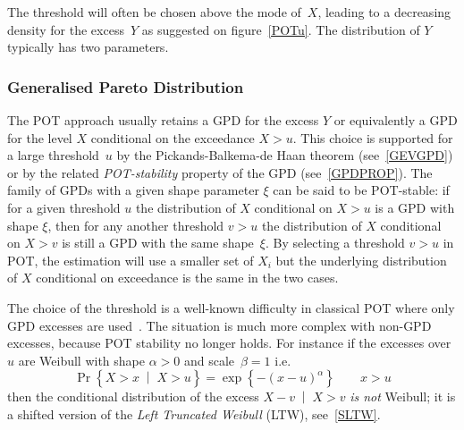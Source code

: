 \documentclass[a4paper]{report}
\newcommand{\Cond}[2]{\left. #1 \;\middle\vert\; #2 \right.}
\begin{document}
The threshold will often be chosen above the mode of~$X$, leading to a
decreasing density for the excess~$Y$ as suggested on
figure~\ref{POTu}. The distribution of $Y$ typically has two
parameters.

\subsubsection*{Generalised Pareto Distribution}
The POT approach usually retains a GPD for the excess $Y$ or
equivalently a GPD for the level $X$ conditional on the exceedance $X
> u$. This choice is supported for a large threshold~$u$ by the
Pickands-Balkema-de Haan theorem
 (see~\ref{GEVGPD}) or by the
related \textit{POT-stability} property of the GPD
(see~\ref{GPDPROP}).   The family of GPDs with a
given shape parameter $\xi$ can be said to be POT-stable: if for a
given threshold $u$ the distribution of $X$ conditional on $X >u$ is a
GPD with shape $\xi$, then for any another threshold $v>u$ the
distribution of $X$ conditional on $X>v$ is still a GPD with the same
shape~$\xi$.  By selecting a threshold $v > u$ in POT, the estimation
will use a smaller set of $X_i$ but the underlying distribution of $X$
conditional on exceedance is the same in the two cases.

The choice of the threshold is a well-known difficulty in
classical POT where only GPD excesses are used~\citep{DAVSMITH}. 
The situation is much more complex with non-GPD excesses, because POT
stability no longer holds.
For instance if the excesses over
$u$ are Weibull with shape $\alpha>0$ and scale~$\beta = 1$ i.e.
$$
   \Pr\left\{\Cond{X>x}{X>u} \right\} =  \exp\left\{ - (x-u)^\alpha \right\} 
   \qquad x > u
$$
%
then the conditional distribution of the excess $\Cond{X-v}{X>v}$ \textit{is not}
Weibull; it is a shifted version of the 
\textit{Left Truncated Weibull} (LTW), see~\ref{SLTW}.
\end{document}
